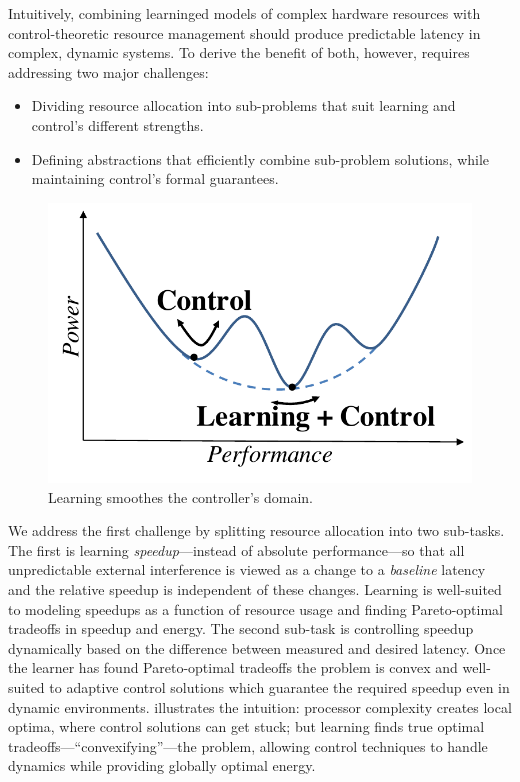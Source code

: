 Intuitively, combining learninged models of complex hardware resources
with control-theoretic resource management should produce predictable
latency in complex, dynamic systems.  To derive the benefit of
both, however, requires addressing two major challenges:
\begin{itemize}[leftmargin=1.5em]
\item Dividing resource allocation into sub-problems that suit
  learning and control's different strengths.
\item Defining abstractions that efficiently combine sub-problem
  solutions, while maintaining control's formal guarantees.
\end{itemize}

\begin{figure}
\centering
\includegraphics[width=.35\columnwidth]{figures/learning_control_doodle.pdf}
\caption{Learning smoothes the controller's domain.}
\label{fig:learning-control-doodle}
\end{figure}
We address the first challenge by splitting resource allocation into
two sub-tasks.  The first is learning \emph{speedup}---instead of
absolute perf\-ormance---so that all unpredictable external
interference is viewed as a change to a \emph{baseline} latency
and the relative speedup is independent of these changes.  Learning is
well-suited to modeling speedups as a function of resource usage and
finding Pareto-optimal tradeoffs in speedup and energy.  The second
sub-task is controlling speedup dynamically based on the difference
between measured and desired latency.  Once the learner has found
Pareto-optimal tradeoffs the problem is convex and well-suited to
adaptive control solutions which guarantee the required speedup even
in dynamic environments.
illustrates the intuition: processor complexity creates local optima,
where control solutions can get stuck; but learning finds true optimal
tradeoffs---``convexifying''---the problem, allowing control
techniques to handle dynamics while providing globally optimal energy.

